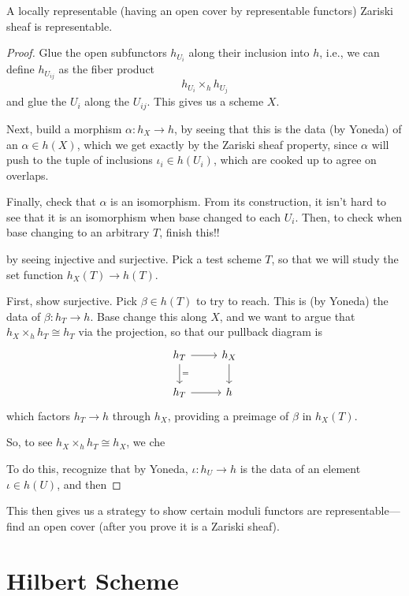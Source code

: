\documentclass[12pt]{article}
\begin{document}
\begin{prop}
    A locally representable (having an open cover by representable functors) Zariski sheaf is representable.
\end{prop}
\begin{proof}
    Glue the open subfunctors $h_{U_i}$ along their inclusion into $h$, i.e., we can define $h_{U_{ij}}$ as the fiber product
    \[h_{U_i} \times_h h_{U_j}\]
    and glue the $U_i$ along the $U_{ij}$. This gives us a scheme $X$.

    Next, build a morphism $\alpha: h_X\to h$, by seeing that this is the data (by Yoneda) of an $\alpha \in h(X)$, which we get exactly by the Zariski sheaf property, since $\alpha$ will push to the tuple of inclusions $\iota_i \in h(U_i)$, which are cooked up to agree on overlaps.

    Finally, check that $\alpha$ is an isomorphism. From its construction, it isn't hard to see that it is an isomorphism when base changed to each $U_i$. Then, to check when base changing to an arbitrary $T$, {\color{red} finish this!!}
    
    by seeing injective and surjective. Pick a test scheme $T$, so that we will study the set function $h_X(T) \to h(T)$.

    First, show surjective. Pick $\beta \in h(T)$ to try to reach. This is (by Yoneda) the data of $\beta: h_T \to h$. Base change this along $X$, and we want to argue that $h_X \times_h h_T \cong h_T$ via the projection, so that our pullback diagram is
    \[\begin{tikzcd}
    h_T \dar["="] \rar & h_X \dar\\
    h_T \rar & h
    \end{tikzcd}\]
    which factors $h_T\to h$ through $h_X$, providing a preimage of $\beta$ in $h_X(T)$.

    So, to see $h_X\times_h h_T \cong h_X$, we che
    
    To do this, recognize that by Yoneda, $\iota: h_U \to h$ is the data of an element $\iota \in h(U)$, and then 
\end{proof}

This then gives us a strategy to show certain moduli functors are representable---find an open cover (after you prove it is a Zariski sheaf).


\section{Hilbert Scheme}
\end{document}
